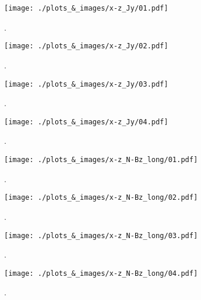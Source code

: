 \documentclass[12pt, letterpaper]{article}
\begin{document}
\begin{figure}[!ht]
\begin{center}
	\texttt{[image: ./plots\_\&\_images/x-z\_Jy/01.pdf]}
	\caption{.}
	\label{fig:x-z_Jy_01}
\end{center}
\end{figure}
\begin{figure}[!ht]
\begin{center}
	\texttt{[image: ./plots\_\&\_images/x-z\_Jy/02.pdf]}
	\caption{.}
	\label{fig:x-z_Jy_02}
\end{center}
\end{figure}
\begin{figure}[!ht]
\begin{center}
	\texttt{[image: ./plots\_\&\_images/x-z\_Jy/03.pdf]}
	\caption{.}
	\label{fig:x-z_Jy_03}
\end{center}
\end{figure}
\begin{figure}[!ht]
\begin{center}
	\texttt{[image: ./plots\_\&\_images/x-z\_Jy/04.pdf]}
	\caption{.}
	\label{fig:x-z_Jy_04}
\end{center}
\end{figure}

\begin{figure}[!ht]
\begin{center}
	\texttt{[image: ./plots\_\&\_images/x-z\_N-Bz\_long/01.pdf]}
	\caption{.}
	\label{fig:x-z_N-Bz_long_01}
\end{center}
\end{figure}
\begin{figure}[!ht]
\begin{center}
	\texttt{[image: ./plots\_\&\_images/x-z\_N-Bz\_long/02.pdf]}
	\caption{.}
	\label{fig:x-z_N-Bz_long_02}
\end{center}
\end{figure}
\begin{figure}[!ht]
\begin{center}
	\texttt{[image: ./plots\_\&\_images/x-z\_N-Bz\_long/03.pdf]}
	\caption{.}
	\label{fig:x-z_N-Bz_long_03}
\end{center}
\end{figure}
\begin{figure}[!ht]
\begin{center}
	\texttt{[image: ./plots\_\&\_images/x-z\_N-Bz\_long/04.pdf]}
	\caption{.}
	\label{fig:x-z_N-Bz_long_04}
\end{center}
\end{figure}
\end{document}
